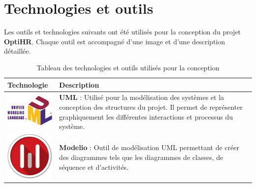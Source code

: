 \section{Technologies et outils}
Les outils et technologies suivants ont été utilisés pour la conception du
projet \textbf{OptiHR}. Chaque outil est accompagné d'une image et d'une
description détaillée.

\vspace{1cm} %

\renewcommand{\arraystretch}{1.5} %

\begin{center}
    \begin{table}[h]  %
       

        \begin{tabular}{|m{4cm}|m{10cm}|}
            \hline
            \textbf{Technologie}                                 & \textbf{Description}                                                                                                                                                                             \\
            \hline

            \includegraphics[width=3cm]{images/logo/uml.png}     & \textbf{UML} : Utilisé pour la modélisation des systèmes et la conception des structures du projet. Il permet de représenter graphiquement les différentes interactions et processus du système. \\
            \hline

            \includegraphics[width=3cm]{images/logo/modelio.png} & \textbf{Modelio} : Outil de modélisation UML permettant de créer des diagrammes tels que les diagrammes de classes, de séquence et d'activités.                                                  \\
            \hline

        \end{tabular}
        \caption{Tableau des technologies et outils utilisés pour la conception} %
        \label{tab:technos_conception} %
    \end{table}
\end{center}

